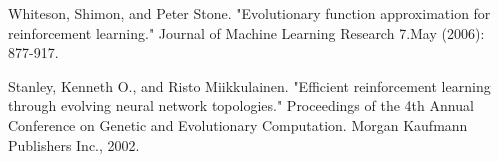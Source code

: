 \documentclass[journal]{IEEEtran}
\begin{document}

%
%
%
\begin{thebibliography}{1}

Whiteson, Shimon, and Peter Stone. "Evolutionary function approximation for reinforcement learning." Journal of Machine Learning Research 7.May (2006): 877-917.

Stanley, Kenneth O., and Risto Miikkulainen. "Efficient reinforcement learning through evolving neural network topologies." Proceedings of the 4th Annual Conference on Genetic and Evolutionary Computation. Morgan Kaufmann Publishers Inc., 2002.
\end{thebibliography}
\end{document}
